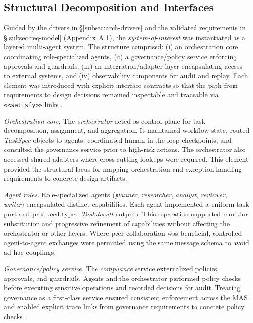 \subsection{Structural Decomposition and Interfaces}\label{subsec:structural-decomposition}
Guided by the drivers in §\ref{subsec:arch-drivers} and the validated requirements in §\ref{subsec:req-model} (Appendix~A.1), the \emph{system-of-interest} was instantiated as a layered multi-agent system. The structure comprised: (i) an orchestration core coordinating role-specialized agents, (ii) a governance/policy service enforcing approvals and guardrails, (iii) an integration/adapter layer encapsulating access to external systems, and (iv) observability components for audit and replay. Each element was introduced with explicit interface contracts so that the path from requirements to design decisions remained inspectable and traceable via \texttt{<<satisfy>>} links \parencite{IEEEStandard1990}.

\emph{Orchestration core.} The \emph{orchestrator} acted as control plane for task decomposition, assignment, and aggregation. It maintained workflow state, routed \emph{TaskSpec} objects to agents, coordinated human-in-the-loop checkpoints, and consulted the governance service prior to high-risk actions. The orchestrator also accessed shared adapters where cross-cutting lookups were required. This element provided the structural locus for mapping orchestration and exception-handling requirements to concrete design artifacts.

\emph{Agent roles.} Role-specialized agents (\emph{planner}, \emph{researcher}, \emph{analyst}, \emph{reviewer}, \emph{writer}) encapsulated distinct capabilities. Each agent implemented a uniform task port and produced typed \emph{TaskResult} outputs. This separation supported modular substitution and progressive refinement of capabilities without affecting the orchestrator or other layers. Where peer collaboration was beneficial, controlled agent-to-agent exchanges were permitted using the same message schema to avoid ad hoc couplings.

\emph{Governance/policy service.} The \emph{compliance} service externalized policies, approvals, and guardrails. Agents and the orchestrator performed policy checks before executing sensitive operations and recorded decisions for audit. Treating governance as a first-class service ensured consistent enforcement across the MAS and enabled explicit trace links from governance requirements to concrete policy checks \parencite{IEEEStandard1990}.

